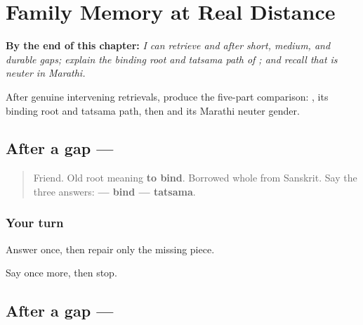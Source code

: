
\chapter{Family Memory at Real Distance}
\label{ch:mr-family-memory}

\begin{chapteropening}
\textbf{By the end of this chapter:} \emph{I can retrieve  and  after short, medium, and durable gaps; explain the binding root and tatsama path of ; and recall that  is neuter in Marathi.}

After genuine intervening retrievals, produce the five-part comparison: , its binding root and tatsama path, then  and its Marathi neuter gender.
\end{chapteropening}

\section[mitra]{After a gap — }

\label{lesson:MR-R14-mitra-r2}



\begin{quote}
Friend. Old root meaning \textbf{to bind}. Borrowed whole from Sanskrit. Say the three answers: \textbf{ — bind — tatsama}.
\end{quote}

\subsection*{Your turn}
Answer once, then repair only the missing piece.

\begin{tcolorbox}[breakable,colback=teal!4,colframe=teal!35!black,title={Before you move on}]
Say \textbf{} once more, then stop.
\end{tcolorbox}
\section[kutumb]{After a gap — }

